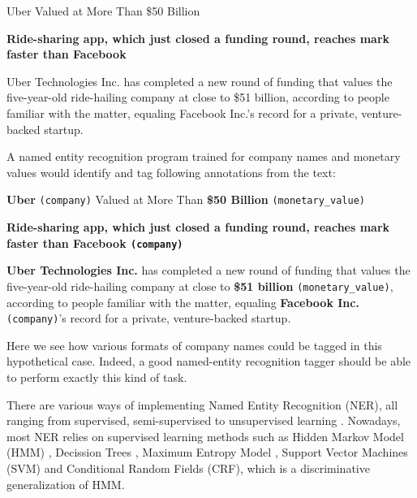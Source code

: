 \begin{displayquote}
{\Large Uber Valued at More Than \$50 Billion}


\textbf{Ride-sharing app, which just closed a funding round, reaches mark faster than Facebook}

Uber Technologies Inc. has completed a new round of funding that values the five-year-old ride-hailing company at close to \$51 billion, according to people familiar with the matter, equaling Facebook Inc.’s record for a private, venture-backed startup.

\end{displayquote}

A named entity recognition program trained for company names and monetary values would identify and tag following annotations from the text:

\begin{displayquote}
{\Large \textbf{Uber} \texttt{(company)} Valued at More Than  \textbf{\$50 Billion } \texttt{(monetary\_value)}}


\textbf{Ride-sharing app, which just closed a funding round, reaches mark faster than \textbf{Facebook} \texttt{(company)}}

\textbf{Uber Technologies Inc.} has completed a new round of funding that values the five-year-old ride-hailing company at close to \textbf{\$51 billion} \texttt{(monetary\_value)}, according to people familiar with the matter, equaling \textbf{Facebook Inc.} \texttt{(company)}’s record for a private, venture-backed startup.

\end{displayquote}

Here we see how various formats of company names could be tagged in this hypothetical case. Indeed, a good named-entity recognition tagger should be able to perform exactly this kind of task.

There are various ways of implementing Named Entity Recognition (NER), all ranging from supervised, semi-supervised to unsupervised learning \citep{nadeau2007survey}. Nowadays, most NER relies on supervised learning methods \citep{nadeau2007survey} such as Hidden Markov Model (HMM) \citep{bikel1997nymble}, Decission Trees \citep{sekine1998decision}, Maximum Entropy Model \citep{borthwick1998exploiting}, Support
Vector Machines (SVM) \citep{asahara2003japanese} and Conditional Random Fields (CRF)\citep{mccallum2003early}, which is a discriminative generalization of HMM\citep{lafferty2001conditional}.

